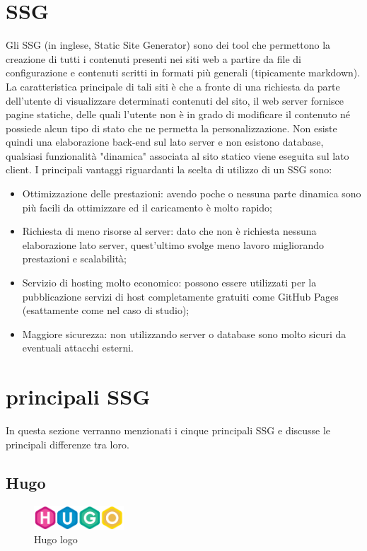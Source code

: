 \documentclass[target=bach,aauheader=]{thud}
\begin{document}
\section{SSG}
Gli SSG (in inglese, Static Site Generator) sono dei tool che permettono la creazione di tutti i contenuti presenti nei siti web a partire da file di configurazione e contenuti scritti in formati più generali (tipicamente markdown).
La caratteristica principale di tali siti è che a fronte di una richiesta da parte dell'utente di visualizzare determinati contenuti del sito, il web server fornisce pagine statiche, delle quali l'utente non è in grado di modificare il contenuto né possiede alcun tipo di stato che ne permetta la personalizzazione. Non esiste quindi una elaborazione back-end sul lato server e non esistono database, qualsiasi funzionalità "dinamica" associata al sito statico viene eseguita sul lato client. \newline
I principali vantaggi riguardanti la scelta di utilizzo di un SSG sono:
\begin{itemize}
\item Ottimizzazione delle prestazioni: avendo poche o nessuna parte dinamica sono più facili da ottimizzare ed il caricamento è molto rapido;
\item Richiesta di meno risorse al server: dato che non è richiesta nessuna elaborazione lato server, quest'ultimo svolge meno lavoro migliorando prestazioni e scalabilità;
\item Servizio di hosting molto economico: possono essere utilizzati per la pubblicazione servizi di host completamente gratuiti come GitHub Pages (esattamente come nel caso di studio);
\item Maggiore sicurezza: non utilizzando server o database sono molto sicuri da eventuali attacchi esterni.
\end{itemize}

\section{principali SSG}
In questa sezione verranno menzionati i cinque principali SSG e discusse le principali differenze tra loro. 

\subsection{Hugo}
\begin{figure}
    \centering
    \includegraphics[width = 0.3\textwidth]{images/Hugo_logo.png}
    \caption{Hugo logo}
\end{figure}
\end{document}
